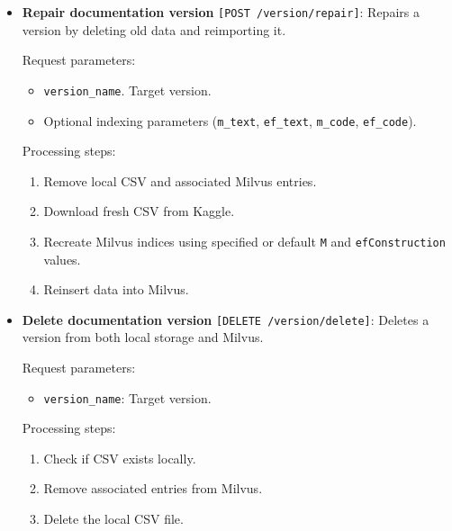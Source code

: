 \begin{itemize}
	Processing steps:
	\begin{enumerate}
		\item Check if CSV exists locally.
		\item Download CSV from Kaggle if missing.
		\item Create Milvus collection if not exists; apply index parameters (\texttt{M}, \texttt{efConstruction}) specific to the version. 
		\begin{itemize}
			\item \texttt{M}: Controls graph connectivity in HNSW; higher values improve accuracy but use more memory.
			\item \texttt{efConstruction}: Controls the candidate pool size during indexing; larger values increase precision at indexing cost.
		\end{itemize}
		\item Insert parsed CSV data into Milvus.
	\end{enumerate}


	\item \textbf{Repair documentation version} \texttt{[POST /version/repair]}:  
	Repairs a version by deleting old data and reimporting it.
	
	Request parameters:
	\begin{itemize}
		\item \texttt{version\_name}. Target version.
		\item Optional indexing parameters (\texttt{m\_text}, \texttt{ef\_text}, \texttt{m\_code}, \texttt{ef\_code}).
	\end{itemize}
	
	Processing steps:
	\begin{enumerate}
		\item Remove local CSV and associated Milvus entries.
		\item Download fresh CSV from Kaggle.
		\item Recreate Milvus indices using specified or default \texttt{M} and \texttt{efConstruction} values.
		\item Reinsert data into Milvus.
	\end{enumerate}


	\item \textbf{Delete documentation version} \texttt{[DELETE /version/delete]}:  
	Deletes a version from both local storage and Milvus.
	
	Request parameters:
	\begin{itemize}
		\item \texttt{version\_name}: Target version.
	\end{itemize}
	
	Processing steps:
	\begin{enumerate}
		\item Check if CSV exists locally.
		\item Remove associated entries from Milvus.
		\item Delete the local CSV file.
	\end{enumerate}
	
\end{itemize}

